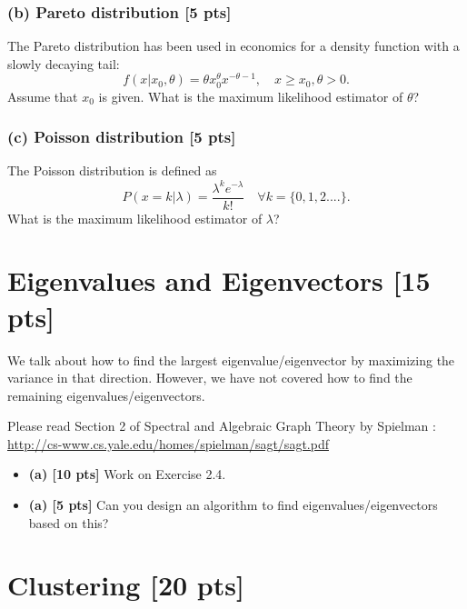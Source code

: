 \documentclass[twoside,10pt]{article}
\begin{document}
\subsubsection*{(b) Pareto distribution [5 pts]}
The Pareto distribution has been used in economics for a density function with a slowly decaying tail:
\begin{equation} \nonumber
f(x | x_0, \theta) = \theta x_0^\theta x^{-\theta -1}, \quad x \geq x_0, \theta > 0.
\end{equation}
Assume that $x_0$ is given. What is the maximum likelihood estimator of $\theta$?

\subsubsection*{(c) Poisson distribution [5 pts]}
The Poisson distribution is defined as
\begin{equation} \nonumber
P(x = k| \lambda) = \frac{\lambda^k e^{-\lambda}}{k!} \quad \forall k = \{ 0,1,2....\}.
\end{equation}
What is the maximum likelihood estimator of $\lambda$?

\section{Eigenvalues and Eigenvectors [15 pts]}

We talk about how to find the largest eigenvalue/eigenvector by maximizing the variance in that direction. However, we have not covered how to find the remaining eigenvalues/eigenvectors. 

Please read Section 2 of Spectral and Algebraic Graph Theory by Spielman : \newline
\url{http://cs-www.cs.yale.edu/homes/spielman/sagt/sagt.pdf}

\begin{itemize}
    \item \textbf{(a) [10 pts]} Work on Exercise 2.4.
    \item \textbf{(a) [5 pts]} Can you design an algorithm to find eigenvalues/eigenvectors based on this?
\end{itemize}


\section{Clustering [20 pts]}
\end{document}
